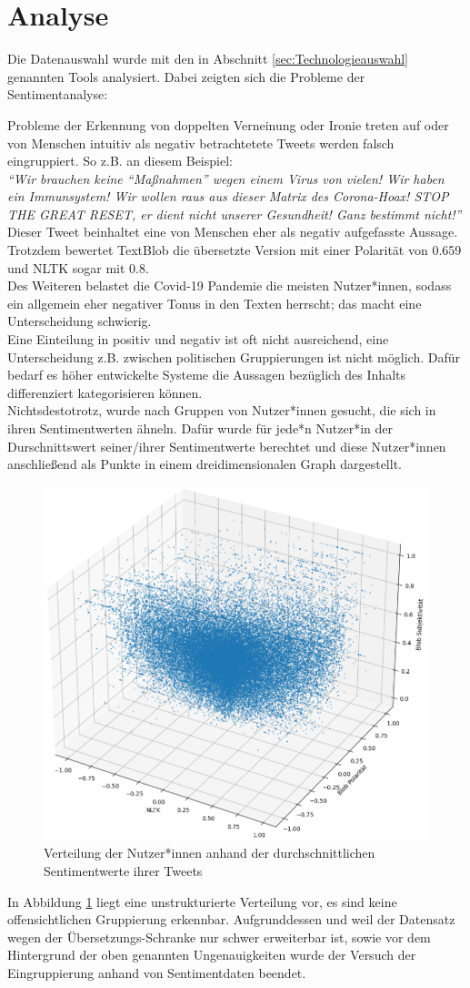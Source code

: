 \section{Analyse}
\label{sentiment-daten-analyse}
Die Datenauswahl wurde mit den in Abschnitt \ref{sec:Technologieauswahl} genannten Tools analysiert. Dabei zeigten sich die Probleme der Sentimentanalyse:

Probleme der Erkennung von doppelten Verneinung oder Ironie treten auf oder von Menschen intuitiv als negativ betrachtetete Tweets werden falsch eingruppiert.
So z.B. an diesem Beispiel:\\
\textit{"`Wir brauchen keine "`Maßnahmen"' wegen einem Virus von vielen! Wir haben ein Immunsystem! Wir wollen raus aus dieser Matrix des Corona-Hoax! STOP THE GREAT RESET, er dient nicht unserer Gesundheit! Ganz bestimmt nicht!"'}\cite{negativ-tweet} \\Dieser Tweet beinhaltet eine von Menschen eher als negativ aufgefasste Aussage. Trotzdem bewertet TextBlob die übersetzte Version mit einer Polarität von 0.659 und NLTK sogar mit 0.8. \\
Des Weiteren belastet die Covid-19 Pandemie  die meisten Nutzer*innen, sodass ein allgemein eher negativer Tonus in den Texten herrscht; das macht eine Unterscheidung schwierig.\\ \newline
Eine Einteilung in positiv und negativ ist oft nicht ausreichend, eine Unterscheidung z.B. zwischen politischen Gruppierungen ist nicht möglich.
Dafür bedarf es höher entwickelte Systeme die Aussagen bezüglich des Inhalts differenziert kategorisieren können.\\
Nichtsdestotrotz, wurde nach Gruppen von Nutzer*innen gesucht, die sich in ihren Sentimentwerten ähneln. 
Dafür wurde für jede*n Nutzer*in der Durschnittswert seiner/ihrer Sentimentwerte berechtet und diese Nutzer*innen anschließend als Punkte in einem dreidimensionalen Graph dargestellt.\\
\begin{figure}[h!]
	\centering
	\includegraphics[width=0.5\linewidth]{images/SentimentPlot}
	\caption{Verteilung der Nutzer*innen anhand der durchschnittlichen Sentimentwerte ihrer Tweets}
	\label{fig:sentimentplot}
\end{figure}
In Abbildung \ref{fig:sentimentplot}  liegt eine unstrukturierte Verteilung vor, es sind keine offensichtlichen Gruppierung erkennbar.
Aufgrunddessen und weil der Datensatz wegen der Übersetzungs-Schranke nur schwer erweiterbar ist, sowie vor dem Hintergrund der oben genannten Ungenauigkeiten wurde der Versuch der Eingruppierung anhand von Sentimentdaten beendet.
